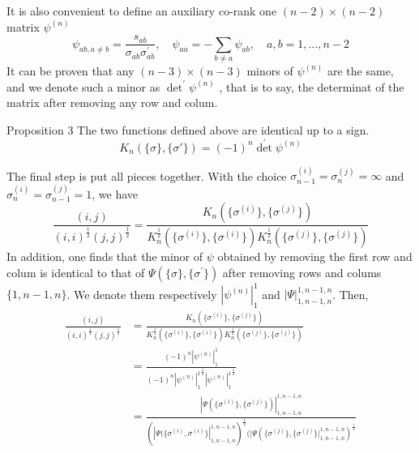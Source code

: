 \documentclass{beamer}
\begin{document}
\begin{frame}
    It is also convenient to define an auxiliary co-rank one $(n-2)\times(n-2)$ matrix $\psi^{(n)}$
    \begin{equation*}
        \psi_{ab,a\neq b}=\frac{s_{ab}}{\sigma_{ab}\sigma_{ab}^{\prime}},\quad\psi_{aa}=-\sum_{b\neq a}\psi_{ab},\quad a,b=1,\ldots,n{-}2
    \end{equation*}
    It can be proven that any $(n-3)\times(n-3)$ minors of $\psi^{(n)}$ are the same, and we denote such a minor as
    ${\det}^\prime\psi^{(n)}$ , that is to say, the determinat of the matrix after removing any row and colum.
    \begin{block}{Proposition 3}
        The two functions defined above are identical up to a sign.
        \begin{equation*}
            K_n(\{\sigma\},\{\sigma'\})=(-1)^n{\det}^\prime\psi^{(n)}
        \end{equation*}
    \end{block}
\end{frame}
\begin{frame}
    The final step is put all pieces together. With the choice  $\sigma_{n-1}^{(i)}=\sigma_n^{(j)}=\infty$ and $\sigma_n^{(i)}=\sigma_{n-1}^{(j)}=1$,
    we have 
    \begin{equation*}
        \frac{(i,j)}{(i,i)^{\frac12}(j,j)^{\frac12}}=\frac{K_n(\{\sigma^{(i)}\},\{\sigma^{(j)}\})}{K_n^{\frac12}(\{\sigma^{(i)}\},\{\sigma^{(i)}\})K_n^{\frac12}(\{\sigma^{(j)}\},\{\sigma^{(j)}\})}
    \end{equation*}
    In addition, one finds that the minor of $\psi$ obtained by removing the first row and colum is identical to 
    that of $\Psi(\{\sigma\},\{\sigma^{\prime}\})$ after removing rows and colums $\{1,n-1,n\}$. We denote them respectively
    $|\psi^{(n)}|^1_1$ and $|\Psi|^{1,n-1,n}_{1,n-1,n}$. Then,
    \begin{align*}
        \frac{(i,j)}{(i,i)^{\frac12}(j,j)^{\frac12}}&=\frac{K_n(\{\sigma^{(i)}\},\{\sigma^{(j)}\})}{K_n^{\frac12}(\{\sigma^{(i)}\},\{\sigma^{(i)}\})K_n^{\frac12}(\{\sigma^{(j)}\},\{\sigma^{(j)}\})}\\
        &=\frac{(-1)^n|\psi^{(n)}|^1_1}{{(-1)^n|\psi^{(n)}|^1_1}^{\frac{1}{2}}{|\psi^{(n)}|^1_1}^{\frac{1}{2}}}\\
        &=\frac{|\Psi(\{\sigma^{(i)}\},\{\sigma^{(j)}\})|_{1,n-1,n}^{1,n-1,n}}{(|\Psi(\{\sigma^{(i)},\sigma^{(i)}\}|_{1,n-1,n}^{1,n-1,n})^{\frac12}(|\Psi(\{\sigma^{(j)}\},\{\sigma^{(j)}\}|_{1,n-1,n}^{1,n-1,n})^{\frac12}}
    \end{align*}
\end{frame}
\end{document}
